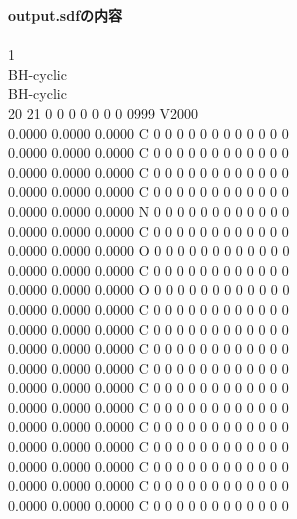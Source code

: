 \documentclass[11pt,titlepage,dvipdfmx,twoside]{jsbook}
\begin{document}
\begin{oframed}
{\bf output.sdfの内容}\\\\
{1 \\
BH-cyclic \\
BH-cyclic \\
 20 21  0  0  0  0  0  0  0  0999 V2000 \\
    0.0000    0.0000    0.0000  C  0  0  0  0  0  0  0  0  0  0  0  0 \\
    0.0000    0.0000    0.0000  C  0  0  0  0  0  0  0  0  0  0  0  0 \\
    0.0000    0.0000    0.0000  C  0  0  0  0  0  0  0  0  0  0  0  0 \\
    0.0000    0.0000    0.0000  C  0  0  0  0  0  0  0  0  0  0  0  0 \\
    0.0000    0.0000    0.0000  N  0  0  0  0  0  0  0  0  0  0  0  0 \\
    0.0000    0.0000    0.0000  C  0  0  0  0  0  0  0  0  0  0  0  0 \\
    0.0000    0.0000    0.0000  O  0  0  0  0  0  0  0  0  0  0  0  0 \\
    0.0000    0.0000    0.0000  C  0  0  0  0  0  0  0  0  0  0  0  0 \\
    0.0000    0.0000    0.0000  O  0  0  0  0  0  0  0  0  0  0  0  0 \\
    0.0000    0.0000    0.0000  C  0  0  0  0  0  0  0  0  0  0  0  0 \\
    0.0000    0.0000    0.0000  C  0  0  0  0  0  0  0  0  0  0  0  0 \\
    0.0000    0.0000    0.0000  C  0  0  0  0  0  0  0  0  0  0  0  0 \\
    0.0000    0.0000    0.0000  C  0  0  0  0  0  0  0  0  0  0  0  0 \\
    0.0000    0.0000    0.0000  C  0  0  0  0  0  0  0  0  0  0  0  0 \\
    0.0000    0.0000    0.0000  C  0  0  0  0  0  0  0  0  0  0  0  0 \\
    0.0000    0.0000    0.0000  C  0  0  0  0  0  0  0  0  0  0  0  0 \\
    0.0000    0.0000    0.0000  C  0  0  0  0  0  0  0  0  0  0  0  0 \\
    0.0000    0.0000    0.0000  C  0  0  0  0  0  0  0  0  0  0  0  0 \\
    0.0000    0.0000    0.0000  C  0  0  0  0  0  0  0  0  0  0  0  0 \\
    0.0000    0.0000    0.0000  C  0  0  0  0  0  0  0  0  0  0  0  0 \\
}
\end{oframed}
\end{document}
